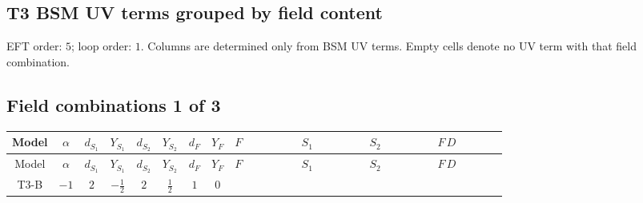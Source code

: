 \documentclass[8pt]{article}
\begin{document}
\begin{landscape}
\section*{T3 BSM UV terms grouped by field content}
EFT order: $5$; loop order: $1$. 
Columns are determined only from BSM UV terms. Empty cells denote no UV term with that field combination.
\tiny
\subsection*{Field combinations 1 of 3}
\begin{longtable}{@{}cccccccc >{\raggedright\arraybackslash}p{0.18\linewidth} >{\raggedright\arraybackslash}p{0.18\linewidth} >{\raggedright\arraybackslash}p{0.18\linewidth} >{\raggedright\arraybackslash}p{0.18\linewidth}@{}}
\toprule
Model & $\alpha$ & $d_{S_1}$ & $Y_{S_1}$ & $d_{S_2}$ & $Y_{S_2}$ & $d_F$ & $Y_F$ & $F$ & $S_1$ & $S_2$ & $F\,D$ \\
\midrule
\endfirsthead
\toprule
Model & $\alpha$ & $d_{S_1}$ & $Y_{S_1}$ & $d_{S_2}$ & $Y_{S_2}$ & $d_F$ & $Y_F$ & $F$ & $S_1$ & $S_2$ & $F\,D$ \\
\midrule
\endhead
T3-B & $-1$ & $2$ & $-\frac{1}{2}$ & $2$ & $\frac{1}{2}$ & $1$ & $0$ & \scriptsize\adjustbox{max width=\linewidth}{$\begin{gathered} -\frac{1}{2} N_{r_1}{}^T\, C\, N_{r_1} M_F\end{gathered}$} & \scriptsize\adjustbox{max width=\linewidth}{$\begin{gathered} -\text{NewScalar1}_{j_1} \text{NewScalar1}_{j_1}{}^{\dagger } M_{\text{S1}}^2 \\ +\frac{1}{2} \text{lambdaS1Inv1} \text{NewScalar1}_{j_3} \text{NewScalar1}_{j_4} \text{T3Scalar1SelfCGInv1}_{j_1,j_3,j_2,j_4} \text{NewScalar1}_{j_1}{}^{\dagger } \text{NewScalar1}_{j_2}{}^{\dagger }\end{gathered}$} & \scriptsize\adjustbox{max width=\linewidth}{$\begin{gathered} -M_{\text{S2}}^2 \text{NewScalar2}_{j_1} \text{NewScalar2}_{j_1}{}^{\dagger } \\ +\frac{1}{2} \text{lambdaS2Inv1} \text{NewScalar2}_{j_3} \text{NewScalar2}_{j_4} \text{T3Scalar2SelfCGInv1}_{j_1,j_3,j_2,j_4} \text{NewScalar2}_{j_1}{}^{\dagger } \text{NewScalar2}_{j_2}{}^{\dagger }\end{gathered}$} & \scriptsize\adjustbox{max width=\linewidth}{$\begin{gathered} +\frac{1}{2} i N_{r_1}{}^T\, C\, \gamma ^{\mu _1}\, D_{\mu _1}\left(N_{r_1}\right)\end{gathered}$} \\

\end{longtable}
\end{landscape}
\end{document}
